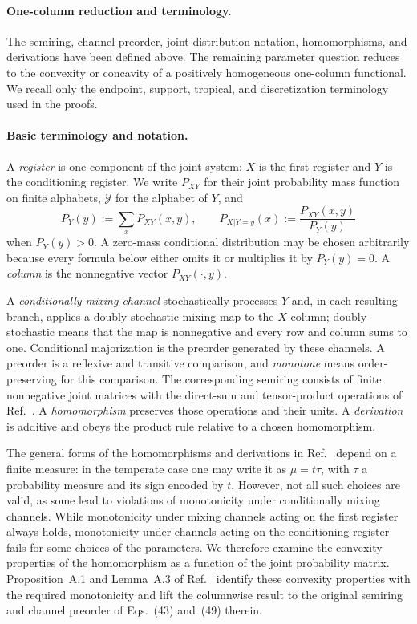 \documentclass[aps,pra,11pt,onecolumn,nofootinbib,tightenlines]{revtex4-2}
\theoremstyle{definition}
\newcommand{\Y}{\mathcal{Y}}
\begin{document}
\ifdefined\IntegratedParameterSections
\paragraph{One-column reduction and terminology.}
The semiring, channel preorder, joint-distribution notation, homomorphisms, and
derivations have been defined above.  The remaining parameter question reduces to
the convexity or concavity of a positively homogeneous one-column functional.  We
recall only the endpoint, support, tropical, and discretization terminology used in
the proofs.
\else
\paragraph{Basic terminology and notation.}
A \emph{register} is one component of the joint system: $X$ is the first
register and $Y$ is the conditioning register.  We write $P_{XY}$ for their
joint probability mass function on finite alphabets, $\Y$ for the alphabet of
$Y$, and
\[
P_Y(y):=\sum_xP_{XY}(x,y),
\qquad
P_{X|Y=y}(x):=\frac{P_{XY}(x,y)}{P_Y(y)}
\]
when $P_Y(y)>0$.  A zero-mass conditional distribution may be chosen
arbitrarily because every formula below either omits it or multiplies it by
$P_Y(y)=0$.  A \emph{column} is the nonnegative vector
$P_{XY}(\mathord\cdot,y)$.

A \emph{conditionally mixing channel} stochastically processes $Y$ and, in
each resulting branch, applies a doubly stochastic mixing map to the
$X$-column; doubly stochastic means that the map is nonnegative and every row
and column sums to one.  Conditional majorization is the preorder generated
by these channels.  A preorder is a reflexive and transitive comparison, and
\emph{monotone} means order-preserving for this comparison.  The corresponding
semiring consists of finite nonnegative
joint matrices with the direct-sum and tensor-product operations of
Ref.~\cite{rubboli2026complete}.  A \emph{homomorphism} preserves those
operations and their units.  A \emph{derivation} is additive and obeys the
product rule relative to a chosen homomorphism.

The general forms of the homomorphisms and derivations in
Ref.~\cite{rubboli2026complete} depend on a finite measure: in the temperate case
one may write it as
$\mu=t\tau$, with $\tau$ a probability measure and its sign encoded by $t$.
However, not all such choices are valid, as some lead to violations of monotonicity
under conditionally mixing channels.
While monotonicity under mixing channels acting on the first register always holds,
monotonicity under channels acting on the conditioning register fails for some choices
of the parameters.  We therefore examine the convexity properties of the homomorphism
as a function of the joint probability matrix.  Proposition~A.1 and Lemma~A.3 of
Ref.~\cite{rubboli2026complete} identify these convexity properties with the required
monotonicity and lift the columnwise result to the original semiring and channel
preorder of Eqs.~(43) and~(49) therein.
\fi
\end{document}
